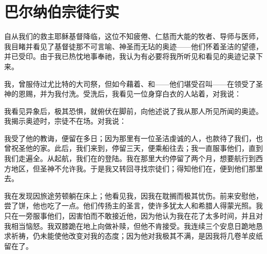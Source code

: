 
\chapter{巴尔纳伯宗徒行实}


\par

自从我们的救主耶稣基督降临，这位不知疲倦、仁慈而大能的牧者、导师与医师，我目睹并看见了基督徒那不可言喻、神圣而无玷的奥迹——他们怀着圣洁的望德，并已受印。由于我已热忱地事奉祂，我认为有必要将我所听见和看见的奥迹记录下来。\par

我，曾服侍过尤比特的大司祭，但如今藉着、和——他们堪受召叫——在领受了圣神的恩赐，并为我付洗。受洗后，我看见一位身穿白衣的人站着，对我说：\par

我看见异象后，极其恐惧，就俯伏在脚前，向他述说了我从那人所见所闻的奥迹。我揭示奥迹时，宗徒不在场。对我说：\par

我受了他的教诲，便留在多日；因为那里有一位圣洁虔诚的人，也款待了我们，也曾祝圣他的家。此后，我们来到，停留三天，便乘船往去；我一直服事他们，直到我们走遍全。从起航，我们在的登陆。我在那里大约停留了两个月，想要航行到西方地区，但圣神不允许我。于是我又转回寻找宗徒们；得知他们在，便到他们那里去。\par

我在发现因旅途劳顿躺在床上；他看见我，因我在耽搁而极其忧伤。前来安慰他，尝了饼，他也吃了一点。他们传扬主的圣言，使许多犹太人和希腊人得蒙光照。我只在一旁服事他们，因害怕而不敢接近他，因为他认为我在花了太多时间，并且对我相当恼怒。我双膝跪在地上向做补赎，但他不肯接受。我连续三个安息日跪地恳求祈祷，仍未能使他改变对我的态度；因为他对我极其不满，是因我将几卷羊皮纸留在了。\par

